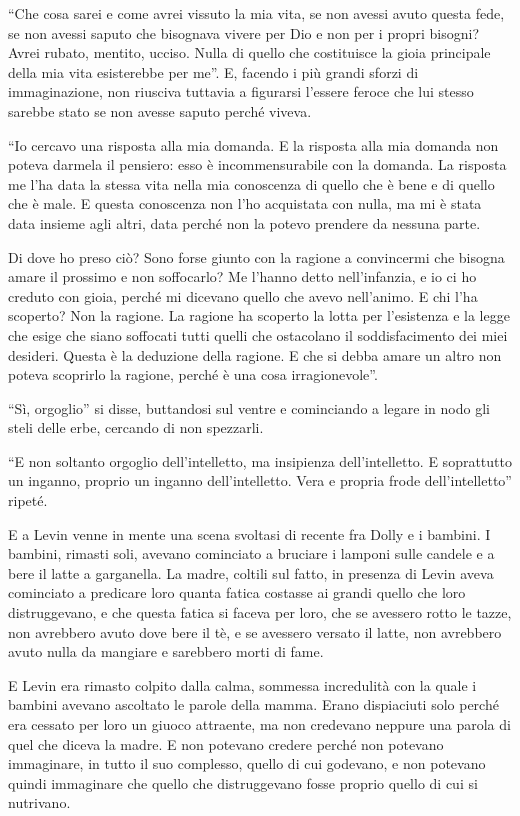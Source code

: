 ``Che cosa sarei e come avrei vissuto la mia vita, se non avessi avuto questa fede, se non avessi saputo che bisognava vivere per Dio e non per i propri bisogni? Avrei rubato, mentito, ucciso. Nulla di quello che costituisce la gioia principale della mia vita esisterebbe per me''. E, facendo i più grandi sforzi di immaginazione, non riusciva tuttavia a figurarsi l'essere feroce che lui stesso sarebbe stato se non avesse saputo perché viveva. 

``Io cercavo una risposta alla mia domanda. E la risposta alla mia domanda non poteva darmela il pensiero: esso è incommensurabile con la domanda. La risposta me l'ha data la stessa vita nella mia conoscenza di quello che è bene e di quello che è male. E questa conoscenza non l'ho acquistata con nulla, ma mi è stata data insieme agli altri, data perché non la potevo prendere da nessuna parte. 

Di dove ho preso ciò? Sono forse giunto con la ragione a convincermi che bisogna amare il prossimo e non soffocarlo? Me l'hanno detto nell'infanzia, e io ci ho creduto con gioia, perché mi dicevano quello che avevo nell'animo. E chi l'ha scoperto? Non la ragione. La ragione ha scoperto la lotta per l'esistenza e la legge che esige che siano soffocati tutti quelli che ostacolano il soddisfacimento dei miei desideri. Questa è la deduzione della ragione. E che si debba amare un altro non poteva scoprirlo la ragione, perché è una cosa irragionevole''. 

``Sì, orgoglio'' si disse, buttandosi sul ventre e cominciando a legare in nodo gli steli delle erbe, cercando di non spezzarli. 

``E non soltanto orgoglio dell'intelletto, ma insipienza dell'intelletto. E soprattutto un inganno, proprio un inganno dell'intelletto. Vera e propria frode dell'intelletto'' ripeté. 

\label{xiii-7} 

E a Levin venne in mente una scena svoltasi di recente fra Dolly e i bambini. I bambini, rimasti soli, avevano cominciato a bruciare i lamponi sulle candele e a bere il latte a garganella. La madre, coltili sul fatto, in presenza di Levin aveva cominciato a predicare loro quanta fatica costasse ai grandi quello che loro distruggevano, e che questa fatica si faceva per loro, che se avessero rotto le tazze, non avrebbero avuto dove bere il tè, e se avessero versato il latte, non avrebbero avuto nulla da mangiare e sarebbero morti di fame. 

E Levin era rimasto colpito dalla calma, sommessa incredulità con la quale i bambini avevano ascoltato le parole della mamma. Erano dispiaciuti solo perché era cessato per loro un giuoco attraente, ma non credevano neppure una parola di quel che diceva la madre. E non potevano credere perché non potevano immaginare, in tutto il suo complesso, quello di cui godevano, e non potevano quindi immaginare che quello che distruggevano fosse proprio quello di cui si nutrivano. 

